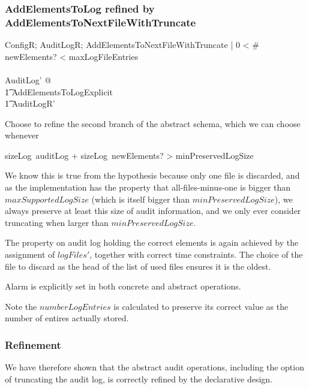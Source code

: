 \subsubsection{AddElementsToLog refined by AddElementsToNextFileWithTruncate}
\label{refine:NextTrunc}
\begin{zed}
ConfigR; AuditLogR; AddElementsToNextFileWithTruncate |
0 < \# newElements? < maxLogFileEntries
\\ \shows
\\ \exists AuditLog' 
@ 
\\ \t1	AddElementsToLogExplicit
\\ \t1	\land AuditLogR'
\end{zed}
Choose to refine the second branch of the abstract schema,
which we can choose whenever
\begin{argue}
	sizeLog~auditLog + sizeLog~newElements? > minPreservedLogSize	
\end{argue}

We know this is true from the hypothesis because only one file is discarded,
and as the implementation has the property that all-files-minus-one
is bigger than $maxSupportedLogSize$
(which is itself bigger than $minPreservedLogSize$),
we always preserve at least this size of audit information,
and we only ever consider truncating when larger than $minPreservedLogSize$.

The property on audit log holding the correct elements is again achieved
by the assignment of $logFiles'$,
together with correct time constraints.
The choice of the file to discard as the head of the list of used files ensures it is the oldest.

Alarm is explicitly set in both concrete and abstract operations.

Note the $numberLogEntries$ is calculated to preserve its correct value
as the number of entires actually stored.

\subsubsection{Refinement}
\label{refine:end}
We have therefore shown that the abstract audit operations,
including the option of truncating the audit log,
is correctly refined by the declarative design.

